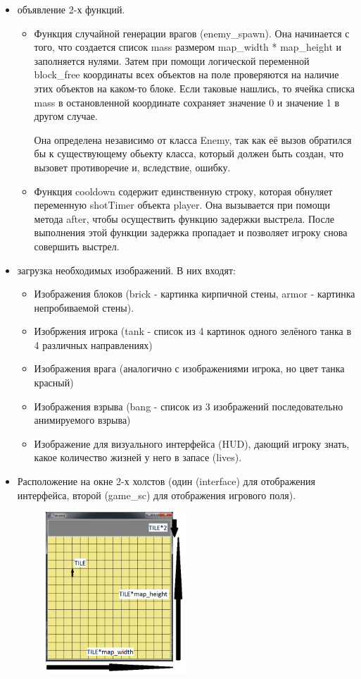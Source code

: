 \begin{itemize}
\begin{itemize}
    \end{itemize}
\item объявление 2-х функций.
    \begin{itemize}
    \item Функция случайной генерации врагов (enemy\_spawn). Она начинается с того, что создается список mass размером map\_width * map\_height и заполняется нулями. Затем при помощи логической переменной block\_free координаты всех объектов на поле проверяются на наличие этих объектов на каком-то блоке. Если таковые нашлись, то ячейка списка mass в остановленной координате сохраняет значение 0 и значение 1 в другом случае.

    Она определена независимо от класса Enemy, так как её вызов обратился бы к существующему обьекту класса, который должен быть создан, что вызовет противоречие и, вследствие, ошибку.
    \item Функция cooldown содержит единственную строку, которая обнуляет переменную shotTimer объекта player. Она вызывается при помощи метода after, чтобы осуществить функцию задержки выстрела. После выполнения этой функции задержка пропадает и позволяет игроку снова совершить выстрел.
    \end{itemize}
\item загрузка необходимых изображений. В них входят:
    \begin{itemize}
    \item Изображения блоков (brick - картинка кирпичной стены, armor - картинка непробиваемой стены).
    \item Изобржения игрока (tank - список из 4 картинок одного зелёного танка в 4 различных направлениях)
    \item Изображения врага (аналогично с изображениями игрока, но цвет танка красный)
    \item Изображения взрыва (bang - список из 3 изображений последовательно анимируемого взрыва)
    \item Изображение для визуального интерфейса (HUD), дающий игроку знать, какое количество жизней у него в запасе (lives).
    \end{itemize}
\item Расположение на окне 2-х холстов (один (interface) для отображения интерфейса, второй (game\_sc) для отображения игрового поля).
\begin{figure}[H]
    \centering
    \includegraphics[width=0.5\textwidth]{./images/image1.png}

\end{figure}
\end{itemize}
